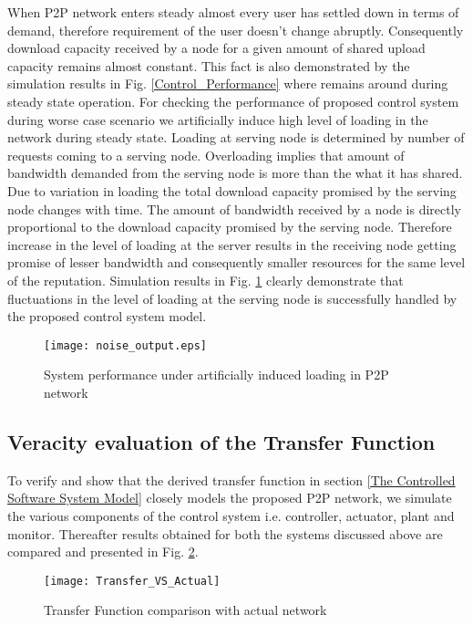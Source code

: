 \documentclass[journal]{IEEEtran}
\begin{document}
When P2P network enters steady almost every user has settled down in terms of demand, therefore requirement of the user doesn't change abruptly. Consequently download capacity received by a node for a given amount of shared upload capacity remains almost constant. This fact is also demonstrated by the simulation results in Fig. \ref{Control_Performance} where  remains around  during steady state operation. For checking the performance of proposed control system during worse case scenario we artificially induce high level of loading in the network during steady state. Loading at serving node is determined by number of requests coming to a serving node. Overloading implies that amount of bandwidth demanded from the serving node is more than the what it has shared. Due to variation in loading the total download capacity promised by the serving node changes with time. The amount of bandwidth received by a node is directly proportional to the download capacity promised by the serving node. Therefore increase in the level of loading at the server results in the receiving node getting promise of lesser bandwidth and consequently smaller resources for the same level of the reputation.
Simulation results in Fig. \ref{ServiceRate} clearly demonstrate that fluctuations in the level of loading at the serving node is successfully handled by the proposed control system model. \begin{figure}[!t]
	\begin{center}
		\texttt{[image: noise\_output.eps]}
		\caption{System performance under artificially induced loading in P2P network}
		\label{ServiceRate}
	\end{center}
\end{figure}
\subsection{Veracity evaluation of the Transfer Function}
\label{TF}

To verify and show that the derived transfer function in section \ref{The Controlled Software System Model} closely models the proposed P2P network, we simulate the various components of the control system i.e. controller, actuator, plant and monitor. Thereafter results obtained for both the systems discussed above are compared and presented in Fig. \ref{transfer_function}. 
\begin{figure}[!t]
	\begin{center}
		\texttt{[image: Transfer\_VS\_Actual]}
		\caption{Transfer Function comparison with actual network }
		\label{transfer_function}
	\end{center}
\end{figure}
\end{document}
